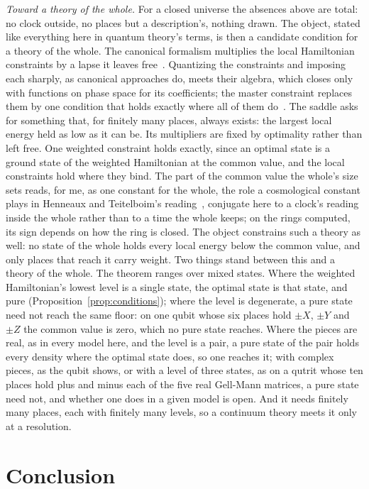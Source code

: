 \documentclass[aps,prd,reprint,superscriptaddress]{revtex4-2}
\begin{document}
\emph{Toward a theory of the whole.} For a closed universe the absences above are total: no clock outside, no places but a description's, nothing drawn. The object, stated like everything here in quantum theory's terms, is then a candidate condition for a theory of the whole. The canonical formalism multiplies the local Hamiltonian constraints by a lapse it leaves free~\cite{ArnowittDeserMisner2008}. Quantizing the constraints and imposing each sharply, as canonical approaches do, meets their algebra, which closes only with functions on phase space for its coefficients; the master constraint replaces them by one condition that holds exactly where all of them do~\cite{Thiemann2006}. The saddle asks for something that, for finitely many places, always exists: the largest local energy held as low as it can be. Its multipliers are fixed by optimality rather than left free. One weighted constraint holds exactly, since an optimal state is a ground state of the weighted Hamiltonian at the common value, and the local constraints hold where they bind. The part of the common value the whole's size sets reads, for me, as one constant for the whole, the role a cosmological constant plays in Henneaux and Teitelboim's reading~\cite{HenneauxTeitelboim1989}, conjugate here to a clock's reading inside the whole rather than to a time the whole keeps; on the rings computed, its sign depends on how the ring is closed. The object constrains such a theory as well: no state of the whole holds every local energy below the common value, and only places that reach it carry weight. Two things stand between this and a theory of the whole. The theorem ranges over mixed states. Where the weighted Hamiltonian's lowest level is a single state, the optimal state is that state, and pure (Proposition~\ref{prop:conditions}); where the level is degenerate, a pure state need not reach the same floor: on one qubit whose six places hold $\pm X$, $\pm Y$ and $\pm Z$ the common value is zero, which no pure state reaches. Where the pieces are real, as in every model here, and the level is a pair, a pure state of the pair holds every density where the optimal state does, so one reaches it; with complex pieces, as the qubit shows, or with a level of three states, as on a qutrit whose ten places hold plus and minus each of the five real Gell-Mann matrices, a pure state need not, and whether one does in a given model is open. And it needs finitely many places, each with finitely many levels, so a continuum theory meets it only at a resolution.

\section{Conclusion}
\label{sec:conclusion}
\end{document}
